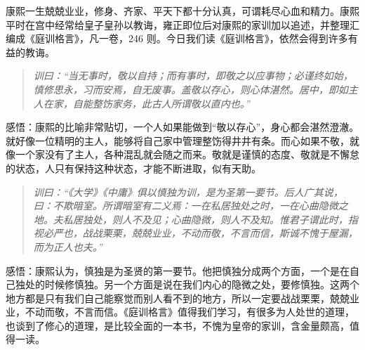 \begin{book}
    康熙一生兢兢业业，修身、齐家、平天下都十分认真，可谓耗尽心血和精力。康熙平时在宫中经常给皇子皇孙以教诲，雍正即位后对康熙的家训加以追述，并整理汇编成《庭训格言》，凡一卷，246 则。今日我们读《庭训格言》，依然会得到许多有益的教诲。
    \begin{quote}\it
        训曰：“当无事时，敬以自持；而有事时，即敬之以应事物；必谨终如始，慎修思永，习而安焉，自无废事。盖敬以存心，则心体湛然。居中，即如主人在家，自能整饬家务，此古人所谓敬以直内也。”
    \end{quote}
    感悟：康熙的比喻非常贴切，一个人如果能做到“敬以存心”，身心都会湛然澄澈。就好像一位精明的主人，能够将自己家中管理整饬得井井有条。而心如果不敬，就像一个家没有了主人，各种混乱就会随之而来。敬就是谨慎的态度、敬就是不懈怠的状态，人只有保持这种状态，才能不断进取，似有天助。
    \begin{quote}\it
        训曰：“《大学》《中庸》俱以慎独为训，是为圣第一要节。后人广其说，曰：不欺暗室。所谓暗室有二义焉：一在私居独处之时，一在心曲隐微之地。夫私居独处，则人不及见；心曲隐微，则人不及知。惟君子谓此时，指视必严也，战战栗栗，兢兢业业，不动而敬，不言而信，斯诚不愧于屋漏，而为正人也夫。”
    \end{quote}
    感悟：康熙认为，慎独是为圣贤的第一要节。他把慎独分成两个方面，一个是在自己独处的时候修慎独。另一个方面是说在我们内心的隐微之处，要修慎独。这两个地方都是只有我们自己能察觉而别人看不到的地方，所以一定要战战栗栗，兢兢业业，不动而敬，不言而信。《庭训格言》值得我们学习，有很多为人处世的道理，也谈到了修心的道理，是比较全面的一本书，不愧为皇帝的家训，含金量颇高，值得一读。
\end{book}
